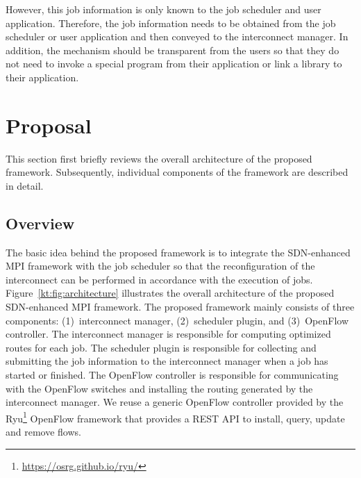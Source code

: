\documentclass[graybox]{svmult}
\begin{document}
However, this job information is only known to the job scheduler and user
application. Therefore, the job information needs to be obtained from the job
scheduler or user application and then conveyed to the interconnect manager.
In addition, the mechanism should be transparent from the users so that they
do not need to invoke a special program from their application or link a
library to their application.

\section{Proposal}\label{kt:sec:iii}

This section first briefly reviews the overall architecture of the proposed
framework. Subsequently, individual components of the framework are described
in detail.

\subsection{Overview}

The basic idea behind the proposed framework is to integrate the SDN-enhanced
MPI framework with the job scheduler so that the reconfiguration of the
interconnect can be performed in accordance with the execution of jobs.
Figure~\ref{kt:fig:architecture} illustrates the overall architecture of the
proposed SDN-enhanced MPI framework. The proposed framework mainly consists of
three components: (1)~interconnect manager, (2)~scheduler plugin, and
(3)~OpenFlow controller. The interconnect manager is responsible for computing
optimized routes  for each job. The scheduler plugin is responsible for
collecting and submitting the job information to the interconnect manager when
a job has started or finished. The OpenFlow controller is responsible for
communicating with the OpenFlow switches and installing the routing generated
by the interconnect manager. We reuse a generic OpenFlow controller provided
by the Ryu\footnote{\url{https://osrg.github.io/ryu/}} OpenFlow framework that
provides a REST API to install, query, update and remove flows.
\end{document}
